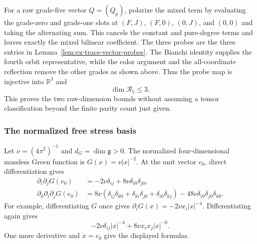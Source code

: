 For a raw grade-five vector $Q=(Q_p)$, polarize the mixed term by evaluating the grade-zero and grade-one slots at
$(F,J)$, $(F,0)$, $(0,J)$, and $(0,0)$ and taking the alternating sum.
This cancels the constant and pure-degree terms and leaves exactly the
mixed bilinear coefficient. The three probes
are the three entries in Lemma~\ref{lem:ex-trace-vector-probes}. The Bianchi
identity supplies the fourth orbit representative, while the color argument
and the all-coordinate reflection remove the other grades as shown above.
Thus the probe map is injective into $\mathbb R^3$ and
\[
 \dim \mathcal R_5\le3.
\]
This proves the two raw-dimension bounds without assuming a tensor
classification beyond the finite parity count just given.

\subsubsection{The normalized free stress basis}

Let $\nu=(4\pi^2)^{-1}$ and $d_G=\dim\mathfrak g>0$. The normalized
four-dimensional massless Green function is $G(x)=\nu|x|^{-2}$. At the unit
vector $e_0$, direct differentiation gives
\begin{align}
 \partial_i\partial_jG(e_0)
   &=-2\nu\delta_{ij}+8\nu\delta_{i0}\delta_{j0},
 \label{eq:ex-trace-green-hessian}\\
 \partial_k\partial_i\partial_jG(e_0)
   &=8\nu(\delta_{ij}\delta_{k0}+\delta_{ki}\delta_{j0}
                 +\delta_{i0}\delta_{kj})
       -48\nu\delta_{i0}\delta_{j0}\delta_{k0}.
 \label{eq:ex-trace-green-third}
\end{align}
For example, differentiating $G$ once gives
$\partial_iG(x)=-2\nu x_i|x|^{-4}$. Differentiating again gives
\[ -2\nu\delta_{ij}|x|^{-4}+8\nu x_ix_j|x|^{-6}. \]
One more derivative and
$x=e_0$ give the displayed formulas.

